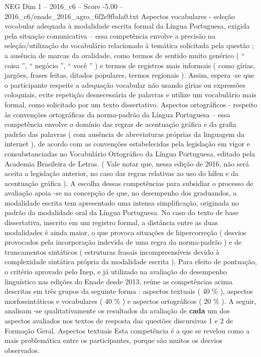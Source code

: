 \begin{textsample}{NEG Dim 1 – 2016\_c6 – Score -5.00 – 2016\_c6/enade\_2016\_agro\_6f2e9fbda0.txt}
Aspectos vocabulares - seleção vocabular adequada à modalidade escrita formal da Língua Portuguesa, exigida pela situação comunicativa – essa competência envolve a precisão na seleção/utilização do vocabulário relacionado à temática solicitada pela questão ; a ausência de marcas da oralidade, como termos de sentido muito genérico ( “ coisa ”, “ negócio ”, “ você ” ) e termos de registros mais informais ( como gírias, jargões, frases feitas, ditados populares, termos regionais ).
Assim, espera -se que o participante respeite a adequação vocabular não usando gírias ou expressões coloquiais, evite repetição desnecessária de palavras e utilize um vocabulário mais formal, como solicitado por um texto dissertativo.
Aspectos ortográficos - respeito às convenções ortográficas da norma-padrão da Língua Portuguesa – essa competência envolve o domínio das regras de acentuação gráfica e da grafia padrão das palavras ( com ausência de abreviaturas próprias da linguagem da internet ), de acordo com as convenções estabelecidas pela legislação em vigor e consubstanciadas no Vocabulário Ortográfico da Língua Portuguesa, editado pela Academia Brasileira de Letras. ( Vale notar que, nessa edição de 2016, não será aceita a legislação anterior, no caso das regras relativas ao uso do hífen e da acentuação gráfica ).
A escolha dessas competências para subsidiar o processo de avaliação apoia -se na concepção de que, no desempenho dos graduandos, a modalidade escrita tem apresentado uma intensa simplificação, originada no padrão da modalidade oral da Língua Portuguesa.
No caso do texto de base dissertativa, inscrito em um registro formal, a distância entre as duas modalidades é ainda maior, o que provoca situações de hipercorreção ( desvios provocados pela incorporação indevida de uma regra da norma-padrão ) e de truncamentos sintáticos ( estruturas frasais incompreensíveis devido à complexidade sintática própria da modalidade escrita ).
Para efeito de pontuação, o critério aprovado pelo Inep, e já utilizado na avaliação do desempenho linguístico nas edições do Enade desde 2013, reúne as competências acima descritas em três grupos da seguinte forma : aspectos textuais ( 40 \% ), aspectos morfossintáticos e vocabulares ( 40 \% ) e aspectos ortográficos ( 20 \% ).
A seguir, analisam -se qualitativamente os resultados da avaliação de \textbf{cada} um dos aspectos avaliados nos textos de resposta das questões discursivas 1 e 2 de Formação Geral.
Aspectos textuais Esta competência é a que se revelou como a mais problemática entre os participantes, porque são muitos os desvios observados.

\end{textsample}
